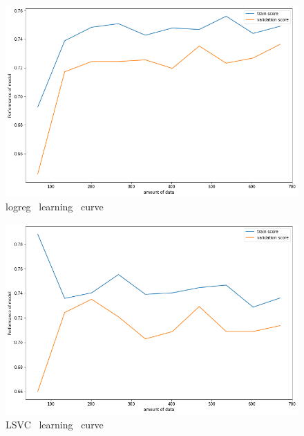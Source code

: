 \documentclass[12pt]{article}
\begin{document}
\begin{figure}[H]
\begin{center}
\includegraphics[scale=0.5]{learning_curve_2.png} 
\caption[]{ logreg \ learning \ curve }
\end{center}
\end{figure}

\begin{figure}[H]
\begin{center}
\includegraphics[scale=0.5]{learning_curve_3.png} 
\caption[]{ LSVC \ learning \ curve }
\end{center}
\end{figure}
\end{document}
